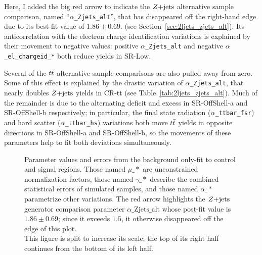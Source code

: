 Here, I added the big red arrow to indicate the $Z\mathrm{+jets}$ alternative sample
comparison, named ``\texttt{$\alpha$\_Zjets\_alt}'', that has disappeared off
the right-hand edge due to its best-fit value of $1.86 \pm 0.69$.
(see Section~\ref{sec:2ljets_zjets_alt}).
Its anticorrelation with the electron charge identification variations is
explained by their movement to negative values:
positive \texttt{$\alpha$\_Zjets\_alt} and negative
\texttt{$\alpha$\_el\_chargeid\_*} both reduce yields in SR-Low.

Several of the $t\bar t$ alternative-sample comparisons are also pulled away
from zero.
Some of this effect is explained by the drastic variation of
\texttt{$\alpha$\_Zjets\_alt}, that nearly doubles $Z\mathrm{+jets}$ yields in CR-tt
(see Table~\ref{tab:2ljets_zjets_alt}).
Much of the remainder is due to the alternating deficit and excess in
SR-OffShell-a and SR-OffShell-b respectively;
in particular, the
final state radiation (\texttt{$\alpha$\_ttbar\_fsr}) and
hard scatter (\texttt{$\alpha$\_ttbar\_hs}) variations both move $t\bar t$
yields in opposite directions in SR-OffShell-a and SR-OffShell-b, so the
movements of these parameters help to fit both deviations simultaneously.

\begin{figure}[tp]
\centering
{}
\hfill
{}
\caption[
Parameter values and errors from the background only-fit to control and signal
regions
]{%
Parameter values and errors from the background only-fit to control and signal
regions.
Those named $\mu\_*$ are unconstrained normalization factors,
those named $\gamma\_*$ describe the combined statistical errors of simulated
samples,
and those named $\alpha\_*$ parametrize other variations.
The red arrow highlights the $Z\mathrm{+jets}$ generator comparison parameter
$\alpha\mathrm{\_Zjets\_alt}$ whose post-fit value is
$1.86 \pm 0.69$;
since it exceeds $1.5$, it otherwise disappeared off the edge of this plot.
\\[0.5em]
This figure is split to increase its scale; the top of its right half continues
from the bottom of its left half.
}
\label{fig:2ljets_fit_parameters}
\end{figure}

